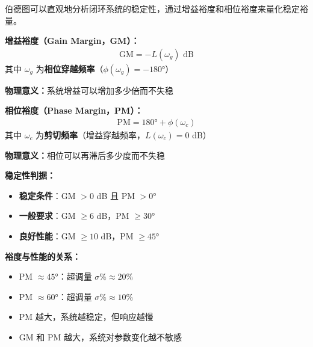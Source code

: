 伯德图可以直观地分析闭环系统的稳定性，通过增益裕度和相位裕度来量化稳定裕量。

\begin{minipage}[t]{0.52\textwidth}
\textbf{增益裕度（Gain Margin，GM）：}
\begin{align*}
\text{GM} = -L(\omega_g) \text{ dB}
\end{align*}
其中 $\omega_g$ 为\textbf{相位穿越频率}（$\phi(\omega_g) = -180°$）

\textbf{物理意义：}系统增益可以增加多少倍而不失稳

\vspace{0.3cm}
\textbf{相位裕度（Phase Margin，PM）：}
\begin{align*}
\text{PM} = 180° + \phi(\omega_c)
\end{align*}
其中 $\omega_c$ 为\textbf{剪切频率}（增益穿越频率，$L(\omega_c) = 0$ dB）

\textbf{物理意义：}相位可以再滞后多少度而不失稳

\vspace{0.3cm}
\textbf{稳定性判据：}
\begin{itemize}
    \item \textbf{稳定条件}：GM $> 0$ dB 且 PM $> 0°$
    \item \textbf{一般要求}：GM $\geq 6$ dB，PM $\geq 30°$
    \item \textbf{良好性能}：GM $\geq 10$ dB，PM $\geq 45°$
\end{itemize}

\vspace{0.2cm}
\textbf{裕度与性能的关系：}
\begin{itemize}
    \item PM $\approx 45°$：超调量 $\sigma\% \approx 20\%$
    \item PM $\approx 60°$：超调量 $\sigma\% \approx 10\%$
    \item PM 越大，系统越稳定，但响应越慢
    \item GM 和 PM 越大，系统对参数变化越不敏感
\end{itemize}
\end{minipage}\hfill

